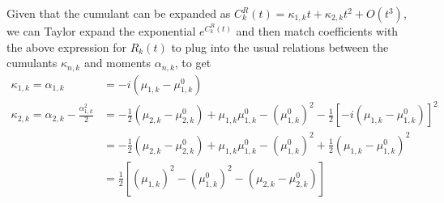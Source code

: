 Given that the cumulant can be expanded as $C_k^R(t) = \kappa_{1,k} t + \kappa_{2,k} t^2 + O(t^3)$, we can Taylor expand the exponential $e^{C_k^R(t)}$ and then match coefficients with the above expression for $R_k(t)$ to plug into the usual relations between the cumulants $\kappa _{n,k}$ and moments $\alpha_{n,k}$, to get
\begin{align}
    \kappa_{1,k} = \alpha_{1,k} &= -i\left(\mu_{1,k}-\mu_{1,k}^0\right)\\
    \kappa_{2,k} = \alpha_{2,k} - \frac{\alpha_{1,k}^2}{2} &= -\frac{1}{2}\left(\mu_{2,k}-\mu_{2,k}^0\right)+\mu_{1,k}\mu_{1,k}^0-\left(\mu_{1,k}^0\right)^2 -\frac{1}{2}{\left[-i\left(\mu_{1,k}-\mu_{1,k}^0\right)\right]^2}\\
&= -\frac{1}{2}\left(\mu_{2,k}-\mu_{2,k}^0\right)+\mu_{1,k}\mu_{1,k}^0-\left(\mu_{1,k}^0\right)^2 +\frac{1}{2}\left(\mu_{1,k}-\mu_{1,k}^0\right)^2\\
&= \frac{1}{2}\left[\left( \mu_{1,k} \right)^2 - \left( \mu_{1,k}^0 \right)^2 - \left( \mu_{2,k} - \mu_{2,k}^0 \right)\right]
\end{align}

